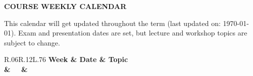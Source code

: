 \documentclass[11pt]{article}
\begin{document}
\begin{minipage}{\textwidth}
	\begin{center}
		\textbf{COURSE WEEKLY CALENDAR}
	\end{center}

	This calendar will get updated throughout the term (last updated on: {\color{myred}\monthdayyeardate\today}). Exam and presentation dates are set, but lecture and workshop topics are subject to change.

	\begin{tabular}{R{.06\linewidth}R{.12\linewidth}L{.76\linewidth}}
		\bfseries Week & \bfseries Date           & \bfseries \hfill Topic                                                  \\
		{\bfseries \wk & \bfseries \dy~\mn~\daten & {\color{\subtcolor}\textbf{\subt}}\dotfill{\color{\subtcolor}\textbf{\ltopic}}}
	\end{tabular}

\end{minipage}

\clearpage


\end{document}
